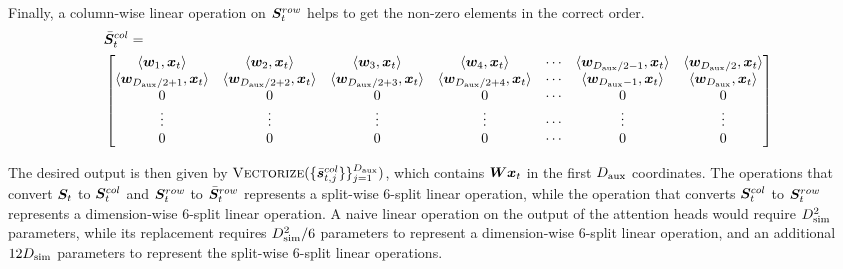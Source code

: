 Finally, a column-wise linear operation on ${\bm{S}}^{row}_t$ helps to get the non-zero elements in the correct order.
\begin{align*}
    &\Bar{{\bm{S}}}^{col}_t  = \\&\begin{bmatrix}
     \langle {\bm{w}}_1, {\bm{x}}_t \rangle & \langle {\bm{w}}_2, {\bm{x}}_t \rangle & \langle {\bm{w}}_3, {\bm{x}}_t \rangle & \langle {\bm{w}}_4, {\bm{x}}_t \rangle  &  \cdots & \langle {\bm{w}}_{D_{\text{aux}}/2-1}, {\bm{x}}_t \rangle & \langle {\bm{w}}_{D_{\text{aux}}/2}, {\bm{x}}_t \rangle \\
     \langle {\bm{w}}_{D_{\text{aux}}/2 + 1}, {\bm{x}}_t \rangle & \langle {\bm{w}}_{D_{\text{aux}}/2 + 2}, {\bm{x}}_t \rangle & \langle {\bm{w}}_{D_{\text{aux}}/2 + 3}, {\bm{x}}_t \rangle & \langle {\bm{w}}_{D_{\text{aux}}/2 + 4}, {\bm{x}}_t \rangle  &  \cdots & \langle {\bm{w}}_{D_{\text{aux}}-1}, {\bm{x}}_t \rangle & \langle {\bm{w}}_{D_{\text{aux}}}, {\bm{x}}_t \rangle \\
     0 &  0 & 0 & 0   & \cdots & 0 & 0 \\
     \vdots & \vdots & \vdots & \vdots & \cdots & \vdots & \vdots \\
     0 &  0 & 0 & 0  & \cdots & 0 & 0
\end{bmatrix}
\end{align*}

The desired output is then given by $\textsc{Vectorize}( \{ \Bar{{\bm{s}}}^{col}_{t, j} \} \}_{j=1}^{D_{\text{aux}}} )$, which contains ${\bm{W}} {\bm{x}}_t$ in the first $D_{\text{aux}}$ coordinates. The operations that convert ${\bm{S}}_t$ to ${\bm{S}}_t^{col}$ and ${\bm{S}}_t^{row}$ to $\Bar{{\bm{S}}}_t^{row}$ represents a split-wise $6$-split linear operation, while the operation that converts ${\bm{S}}^{col}_t$ to ${\bm{S}}_t^{row}$ represents a dimension-wise $6$-split linear operation. A naive linear operation on the output of the attention heads would require $D_{\text{sim}}^2$ parameters, while its replacement requires $D_{\text{sim}}^2/6$ parameters to represent a dimension-wise $6$-split linear operation, and an additional $12 D_{\text{sim}}$ parameters to represent the split-wise $6$-split linear operations.






